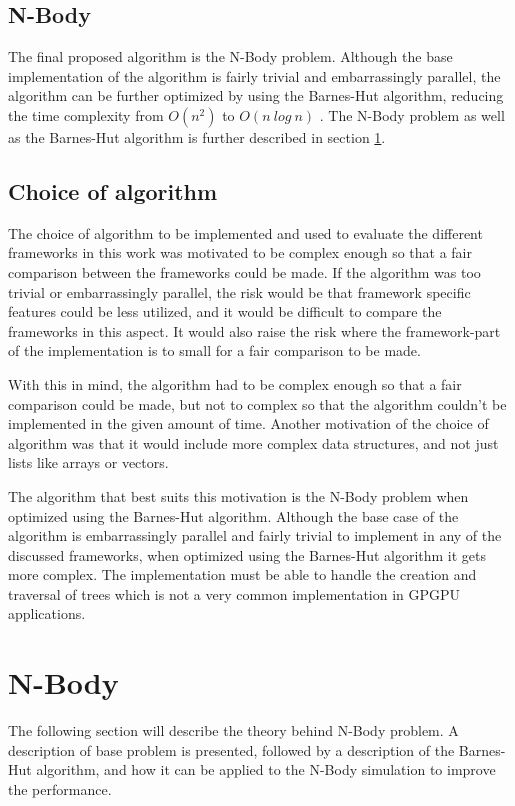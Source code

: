 \subsection{N-Body} \label{subsec:TheoryNBody}

The final proposed algorithm is the N-Body problem. Although the base implementation of the algorithm is fairly trivial and embarrassingly parallel, the algorithm can be further optimized by using the Barnes-Hut algorithm, reducing the time complexity from $O(n^2)$ to $O(n \ log \ n)$ \cite{barnes1986hierarchical}.  The N-Body problem as well as the Barnes-Hut algorithm is further described in section \ref{sec:NBodyTheory}.

\subsection{Choice of algorithm}

The choice of algorithm to be implemented and used to evaluate the different frameworks in this work was motivated to be complex enough so that a fair comparison between the frameworks could be made. If the algorithm was too trivial or embarrassingly parallel, the risk would be that framework specific features could be less utilized, and it would be difficult to compare the frameworks in this aspect. It would also raise the risk where the framework-part of the implementation is to small for a fair comparison to be made. 

With this in mind, the algorithm had to be complex enough so that a fair comparison could be made, but not to complex so that the algorithm couldn't be implemented in the given amount of time. Another motivation of the choice of algorithm was that it would include more complex data structures, and not just lists like arrays or vectors. 

The algorithm that best suits this motivation is the N-Body problem when optimized using the Barnes-Hut algorithm. Although the base case of the algorithm is embarrassingly parallel and fairly trivial to implement in any of the discussed frameworks, when optimized using the Barnes-Hut algorithm it gets more complex. The implementation must be able to handle the creation and traversal of trees which is not a very common implementation in GPGPU applications.

\section{N-Body} \label{sec:NBodyTheory}
The following section will describe the theory behind N-Body problem. A description of base problem is presented, followed by a description of the Barnes-Hut algorithm, and how it can be applied to the N-Body simulation to improve the performance.

